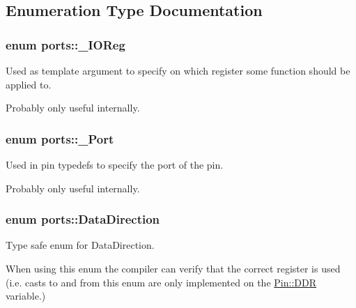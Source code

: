 \subsection{Enumeration Type Documentation}
\subsubsection[{\texorpdfstring{\+\_\+\+I\+O\+Reg}{_IOReg}}]{\setlength{\rightskip}{0pt plus 5cm}enum {\bf ports\+::\+\_\+\+I\+O\+Reg}\hspace{0.3cm}{\ttfamily [strong]}}\hypertarget{namespaceports_a739630fb6b9a9b963453db8e865b6b14}{}\label{namespaceports_a739630fb6b9a9b963453db8e865b6b14}


Used as template argument to specify on which register some function should be applied to. 

Probably only useful internally. 
\subsubsection[{\texorpdfstring{\+\_\+\+Port}{_Port}}]{\setlength{\rightskip}{0pt plus 5cm}enum {\bf ports\+::\+\_\+\+Port}\hspace{0.3cm}{\ttfamily [strong]}}\hypertarget{namespaceports_a9949317f344930bd6ad1097e80c97b67}{}\label{namespaceports_a9949317f344930bd6ad1097e80c97b67}


Used in pin typedefs to specify the port of the pin. 

Probably only useful internally. 
\subsubsection[{\texorpdfstring{Data\+Direction}{DataDirection}}]{\setlength{\rightskip}{0pt plus 5cm}enum {\bf ports\+::\+Data\+Direction}\hspace{0.3cm}{\ttfamily [strong]}}\hypertarget{namespaceports_a46987e78fa447129742fadda5eccafb4}{}\label{namespaceports_a46987e78fa447129742fadda5eccafb4}


Type safe enum for Data\+Direction. 

When using this enum the compiler can verify that the correct register is used (i.\+e. casts to and from this enum are only implemented on the \hyperlink{structports_1_1Pin_aaebb4d6cb5db0635fe8e7d6e7d315c7f}{Pin\+::\+D\+DR} variable.)

